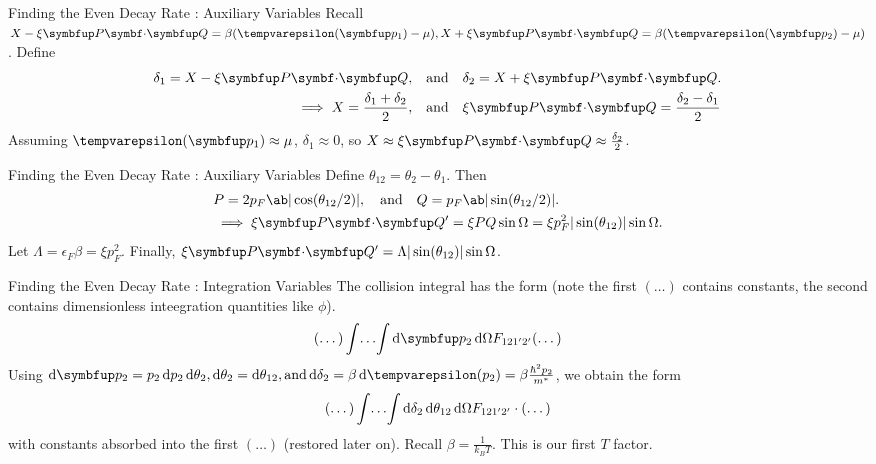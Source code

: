 \begin{frame}{Finding the Even Decay Rate : \alert{Auxiliary Variables}}
  Recall \(X-\xi\vv{P}\vdot\vv{Q} = \beta(\epsilon(\vv{p}_1)-\mu), X+\xi\vv{P}\vdot\vv{Q} = \beta(\epsilon(\vv{p}_2)-\mu)\). Define
  \begin{align}
    \delta_1 = X-\xi\vv{P}\vdot\vv{Q},      & \mathand \delta_2 = X+\xi\vv{P}\vdot\vv{Q}.                 \\
    \implies X=\frac{\delta_1+\delta_2}{2}, & \mathand \xi\vv{P}\vdot\vv{Q} = \frac{\delta_2-\delta_1}{2}
  \end{align}
  Assuming \(\epsilon(\vv{p}_1) \approx \mu\), \(\delta_1 \approx 0\), so \(X \approx \xi\vv{P}\vdot\vv{Q} \approx \frac{\delta_2}{2}\).
\end{frame}

\begin{frame}{Finding the Even Decay Rate : \alert{Auxiliary Variables}}
  Define \(\theta_{12} = \theta_2 - \theta_1\). Then
  \begin{align}
     & P=2p_F\ab|\cos(\theta_{12}/2)|, \mathand Q=p_F\ab|\sin(\theta_{12}/2)|.                      \\
     & \implies \xi\vv{P}\vdot\vv{Q'} = \xi PQ \sin\Omega = \xi p_F^2|\sin(\theta_{12})|\sin\Omega. \\
  \end{align}
  Let \(\Lambda = \epsilon_F \beta = \xi p_F^2\). Finally, \(\xi\vv{P}\vdot\vv{Q'}=\Lambda|\sin(\theta_{12})|\sin\Omega\).
\end{frame}

\begin{frame}{Finding the Even Decay Rate : \alert{Integration Variables}}
  The collision integral has the form (note the first \((\dots)\) contains constants, the second contains dimensionless inteegration quantities like \(\phi\)).
  \begin{equation}
    (\dots) \dotsint \odif{\vv{p}_2} \odif{\Omega} F_{121'2'} (\dots)
  \end{equation}
  Using \(\odif{\vv{p}_2} = p_2\odif{p_2}\odif{\theta_2}, \odif{\theta_2} = \odif{\theta_{12}}, \mathrm{and} \odif{\delta_2} = \beta\odif{\epsilon(p_2)}=\beta\frac{\hbar^2p_2}{m^*}\), we obtain the form
  \begin{equation}
    (\dots) \dotsint \odif{\delta_2} \odif{\theta_{12}} \odif{\Omega} F_{121'2'} \cdot(\dots)
  \end{equation}
  with constants absorbed into the first \((\dots)\) (restored later on). Recall \(\beta=\frac{1}{k_B T}\). \alert{This is our first \(T\) factor}.
\end{frame}

